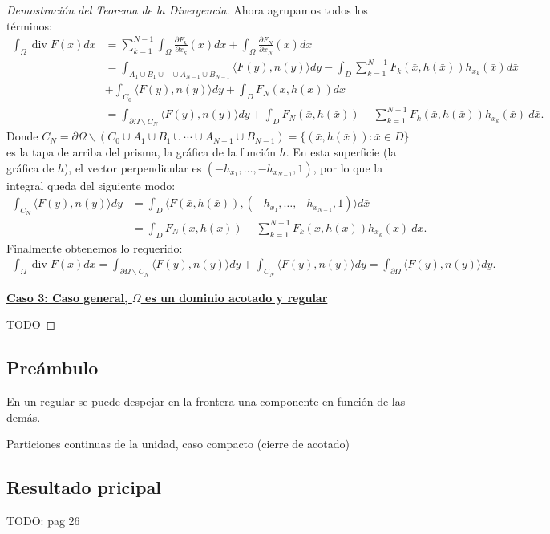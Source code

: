 \documentclass[12pt,spanish]{article}
\theoremstyle{definition}
\theoremstyle{remark}
\begin{document}
\begin{proof}[Demostración del Teorema de la Divergencia]
	Ahora agrupamos todos los términos:
	\begin{align*}
	\int_\Omega \operatorname{div}F(x)dx&=\sum_{k=1}^{N-1}\int_\Omega\frac{\partial F_k}{\partial x_k}(x)dx+\int_\Omega\frac{\partial F_N}{\partial x_N}(x)dx\\
	&=\int_{A_1\cup B_1\cup\cdots\cup A_{N-1}\cup B_{N-1}}\langle F(y),n(y)\rangle dy-\int_D\sum_{k=1}^{N-1}F_k(\bar{x},h(\bar{x}))h_{x_k}(\bar{x})d\bar{x}\\
	&+\int_{C_0}\langle F(y),n(y)\rangle dy + \int_D F_N(\bar{x},h(\bar{x}))d\bar{x} \\
	&=\int_{\partial\Omega\backslash C_N}\langle F(y),n(y)\rangle dy+\int_D F_N(\bar{x},h(\bar{x}))-\sum_{k=1}^{N-1}F_k(\bar{x},h(\bar{x}))h_{x_k}(\bar{x}) \ d\bar{x}.
	\end{align*}
	Donde $C_N=\partial\Omega \backslash\left(C_0\cup A_1\cup B_1\cup\cdots\cup A_{N-1}\cup B_{N-1}\right)=\{(\bar{x},h(\bar{x})):\bar{x}\in D\}$ es la tapa de arriba del prisma, la gráfica de la función $h$. En esta superficie (la gráfica de $h$), el vector perpendicular es $(-h_{x_1},\ldots,-h_{x_{N-1}},1)$, por lo que la integral queda del siguiente modo:
	\begin{align*}
	\int_{C_N} \langle F(y),n(y)\rangle dy &= \int_D \langle F(\bar{x},h(\bar{x})),(-h_{x_1},\ldots,-h_{x_{N-1}},1)\rangle d\bar{x} \\
	&=\int_D F_N(\bar{x},h(\bar{x}))-\sum_{k=1}^{N-1}F_k(\bar{x},h(\bar{x}))h_{x_k}(\bar{x}) \ d\bar{x}.
	\end{align*}
	Finalmente obtenemos lo requerido:
	\begin{align*}
	\int_\Omega \operatorname{div}F(x)dx=\int_{\partial\Omega\backslash C_N}\langle F(y),n(y)\rangle dy+\int_{C_N} \langle F(y),n(y)\rangle dy=\int_{\partial\Omega}\langle F(y),n(y)\rangle dy.
	\end{align*}
	
	
	\underline{\textbf{Caso 3: Caso general, $\Omega$ es un dominio acotado y regular}}
	
	TODO
	
\end{proof}

\subsection{Preámbulo}

En un regular se puede despejar en la frontera una componente en función de las demás.

Particiones continuas de la unidad, caso compacto (cierre de acotado)

\subsection{Resultado pricipal}

TODO: pag 26
\end{document}
